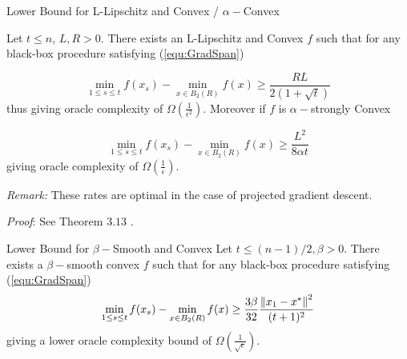 \begin{theorem}{Lower Bound for L-Lipschitz and Convex / $\alpha-$Convex }

Let  $t \leq n$, $L,R > 0$. There exists an L-Lipschitz and Convex $f$ such that for any black-box procedure satisfying (\ref{equ:GradSpan})

\begin{equation}
\min_{1 \leq s \leq t} f(x_s) - \min_{x \in B_2(R)}f(x) \geq \frac{RL}{2(1+\sqrt{t})}
\end{equation}
thus giving oracle complexity of $\Omega\left(\frac{1}{\epsilon^2}\right)$. Moreover if $f$ is $\alpha-$strongly  Convex

\begin{equation}
\min_{1 \leq s \leq t} f(x_s) - \min_{x \in B_2(R)}f(x) \geq \frac{L^2}{8 \alpha t}
\end{equation}
giving oracle complexity of $\Omega\left(\frac{1}{\epsilon}\right)$.

\textit{Remark:} These rates are optimal in the case of projected gradient descent.

\textit{Proof}: See Theorem $3.13$ \cite{bubeck}.
\end{theorem}

\begin{theorem}\label{lower_bound_smooth}{Lower Bound for $\beta-$Smooth and Convex}
Let $t \leq (n-1)/2, \beta > 0$. There exists a $\beta-$smooth convex $f$ such that for any black-box procedure satisfying (\ref{equ:GradSpan})
\begin{equation}
    \min_{1 \leq s \leq t} f(x_s) - \min_{x \in B_2(R)}f(x) \geq \frac{3\beta}{32} \frac{\left\lVert x_1 - x^{*}\right\rVert^2}{(t+1)^2}
\label{equ:LowerBoundBetaSmooth}
\end{equation}
giving a lower oracle  complexity  bound of $\Omega\left(\frac{1}{\sqrt{\epsilon}}\right)$.
\label{Theorem:LowerBoundBeta}
\end{theorem}

